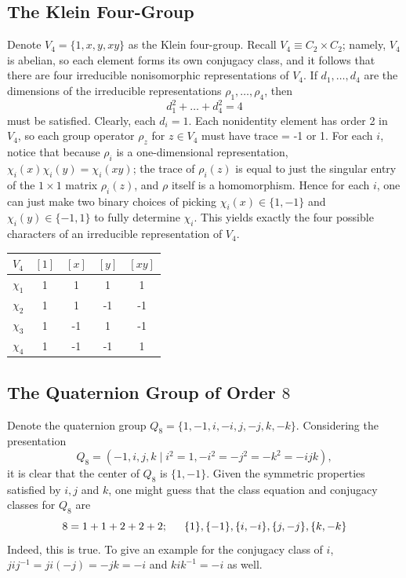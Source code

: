 \documentclass[12pt]{article}
\begin{document}
\subsection{The Klein Four-Group}
Denote $V_4 = \{1, x, y, xy\}$ as the Klein four-group. 
Recall $V_4 \equiv C_2 \times C_2$; 
namely, $V_4$ is abelian, so each element forms its own conjugacy class, and it follows that there are four irreducible nonisomorphic representations of $V_4$. 
If $d_1, \ldots, d_4$ are the dimensions of the irreducible representations $\rho_1, \ldots, \rho_4$, then 
$$d_{1}^{2} + \ldots + d_{4}^{2} = 4$$ 
must be satisfied. 
Clearly, each $d_i = 1$. 
Each nonidentity element has order 2 in $V_4$, so each group operator $\rho_{z}$ for $z \in V_4$ must have trace = -1 or 1. 
For each $i$, notice that because $\rho_{i}$ is a one-dimensional representation, $\chi_{i}(x) \chi_{i}(y) = \chi_{i}(xy)$; 
the trace of $\rho_{i}(z)$ is equal to just the singular entry of the $1 \times 1$ matrix $\rho_{i}(z)$, and $\rho$ itself is a homomorphism.
Hence for each $i$, one can just make two binary choices of picking $\chi_{i}(x) \in \{1, -1\}$ and $\chi_{i}(y) \in \{-1, 1\}$ to fully determine $\chi_{i}$. 
This yields exactly the four possible characters of an irreducible representation of $V_4$. 
\begin{center}
  \begin{tabular}{l | cccc}
    $V_4$ & $[1]$ & $[x]$ & $[y]$ & $[xy]$ \\
    \midrule
    $\chi_1$ & 1 & 1  & 1 & 1 \\
    $\chi_2$ & 1 & 1 & -1 & -1 \\
    $\chi_3$ & 1 & -1 & 1 & -1 \\ 
    $\chi_4$ & 1 & -1 & -1 & 1
  \end{tabular}
\end{center}

\subsection{The Quaternion Group of Order $8$}
Denote the quaternion group $Q_8 = \{1, -1, i, -i, j, -j, k, -k\}$. 
Considering the presentation 
$$Q_8 = (-1, i, j, k \mid i^2 = 1, -i^2 = -j^2 = -k^2 = -ijk),$$
it is clear that the center of $Q_8$ is $\{1, -1\}$. 
Given the symmetric properties satisfied by $i, j$ and $k$, one might guess that the class equation and conjugacy classes for $Q_8$ are
$$8 = 1 + 1 + 2 + 2 + 2; \hspace{1.5em} \{1\}, \{-1\}, \{i, -i\}, \{j, -j\}, \{k, -k\}$$ 
Indeed, this is true. 
To give an example for the conjugacy class of $i$, $jij^{-1} = ji(-j) = -jk = -i$ and $kik^{-1} = -i$ as well. 
\end{document}
